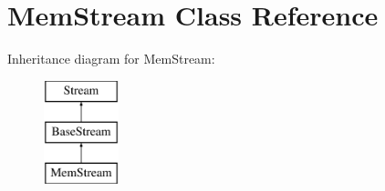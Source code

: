 \hypertarget{class_mem_stream}{}\section{Mem\+Stream Class Reference}
\label{class_mem_stream}
Inheritance diagram for Mem\+Stream\+:\begin{figure}[H]
\begin{center}
\leavevmode
\includegraphics[height=3.000000cm]{class_mem_stream}
\end{center}
\end{figure}
